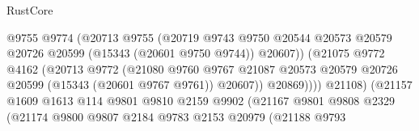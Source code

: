 \begin{lexlean}{RustCore}
\begin{coremodule}
                                          @9755
                                          @9774
                                          (@20713
                                            @9755
                                            (@20719
                                              @9743
                                              @9750
                                              @20544
                                              @20573
                                              @20579
                                              @20726
                                              @20599
                                              (@15343 (@20601 @9750 @9744))
                                              @20607))
                                          (@21075
                                            @9772
                                            @4162
                                            (@20713
                                              @9772
                                              (@21080
                                                @9760
                                                @9767
                                                @21087
                                                @20573
                                                @20579
                                                @20726
                                                @20599
                                                (@15343 (@20601 @9767 @9761))
                                                @20607))
                                            @20869))))
                                    @21108)
                                  (@21157
                                    @1609
                                    @1613
                                    @114
                                    @9801
                                    @9810
                                    @2159
                                    @9902
                                    (@21167
                                      @9801
                                      @9808
                                      @2329
                                      (@21174
                                        @9800
                                        @9807
                                        @2184
                                        @9783
                                        @2153
                                        @20979
                                        (@21188
                                          @9793

\end{coremodule}
\end{lexlean}
